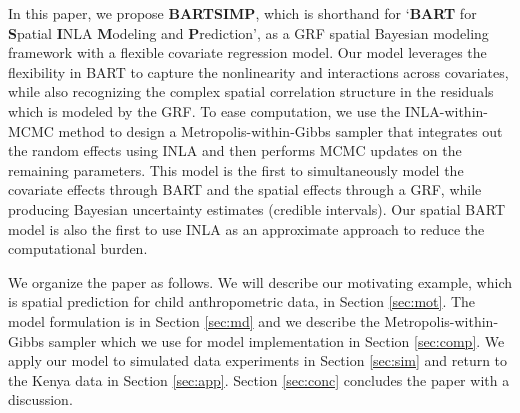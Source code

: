 \documentclass[a4paper,12pt]{article}
\begin{document}
In this paper, we propose \textbf{BARTSIMP}, which is shorthand for `\textbf{BART} for \textbf{S}patial \textbf{I}NLA \textbf{M}odeling and \textbf{P}rediction', as a GRF spatial Bayesian modeling framework with a flexible covariate regression model. Our model leverages the flexibility in BART to capture the nonlinearity and interactions across covariates, while also recognizing the complex spatial correlation structure in the residuals which is modeled by the GRF. To ease computation, we use the INLA-within-MCMC method \citep{gomez2018markov} to design a Metropolis-within-Gibbs sampler that integrates out the random effects using INLA and then performs MCMC updates on the remaining parameters. {\color{blue} This model is the first to simultaneously model the covariate effects through BART and the spatial effects through a GRF, while producing Bayesian uncertainty estimates (credible intervals). Our spatial BART model is also the first to use INLA as an approximate approach to reduce the computational burden.}

We organize the paper as follows. We will describe our motivating example, which is spatial prediction for child anthropometric data, in Section \ref{sec:mot}. The model formulation is in Section \ref{sec:md} and we describe the Metropolis-within-Gibbs sampler which we use for model implementation in Section \ref{sec:comp}. We apply our model to simulated data experiments in Section \ref{sec:sim} and return to the Kenya data in Section \ref{sec:app}. Section \ref{sec:conc} concludes the paper with a discussion.
\end{document}
